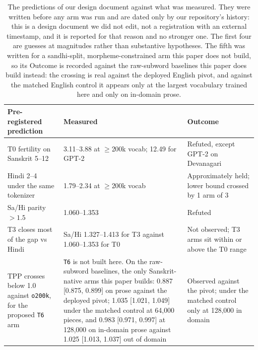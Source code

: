 \begin{table}[t]
\centering
\small
\begin{tabular}{p{}p{}p{}}
\toprule
Pre-registered prediction & Measured & Outcome \\
\midrule
T0 fertility on Sanskrit 5--12 & 3.11--3.88 at $\geq$200k vocab; 12.49 for GPT-2 & Refuted, except GPT-2 on Devanagari \\
Hindi 2--4 under the same tokenizer & 1.79--2.34 at $\geq$200k vocab & Approximately held; lower bound crossed by 1 arm of 3 \\
Sa/Hi parity $>1.5$ & 1.060--1.353 & Refuted \\
T3 closes most of the gap vs Hindi & Sa/Hi 1.327--1.413 for T3 against 1.060--1.353 for T0 & Not observed; T3 arms sit within or above the T0 range \\
TPP crosses below 1.0 against \texttt{o200k}, for the proposed \texttt{T6} arm & \texttt{T6} is not built here. On the raw-subword baselines, the only Sanskrit-native arms this paper builds: 0.887 [0.875, 0.899] on prose against the deployed pivot; 1.035 [1.021, 1.049] under the matched control at 64,000 pieces, and 0.983 [0.971, 0.997] at 128,000 on in-domain prose against 1.025 [1.013, 1.037] out of domain & Observed against the pivot; under the matched control only at 128,000 in domain \\
\bottomrule
\end{tabular}
\caption{The predictions of our design document against what was measured. They were written before any arm was run and are dated only by our repository's history: this is a design document we did not edit, not a registration with an external timestamp, and it is reported for that reason and no stronger one. The first four are guesses at magnitudes rather than substantive hypotheses. The fifth was written for a sandhi-split, morpheme-constrained arm this paper does not build, so its Outcome is recorded against the raw-subword baselines this paper does build instead: the crossing is real against the deployed English pivot, and against the matched English control it appears only at the largest vocabulary trained here and only on in-domain prose.}
\label{tab:prereg}
\end{table}
